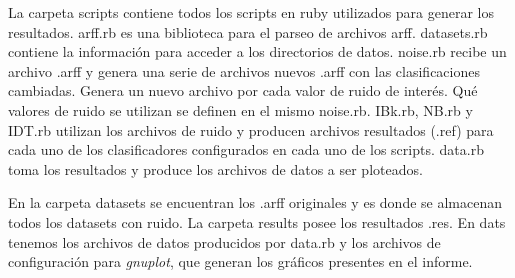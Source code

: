 \documentclass[a4paper,10pt]{article}
\begin{document}
La carpeta \textsf{scripts} contiene todos los scripts en ruby utilizados para generar los resultados. \textsf{arff.rb} es una biblioteca para el parseo de archivos \textsf{arff}. \textsf{datasets.rb} contiene la información para acceder a los directorios de datos. \textsf{noise.rb} recibe un archivo \textsf{.arff} y genera una serie de archivos nuevos \textsf{.arff} con las clasificaciones cambiadas. Genera un nuevo archivo por cada valor de ruido de interés. Qué valores de ruido se utilizan se definen en el mismo \textsf{noise.rb}. \textsf{IBk.rb}, \textsf{NB.rb} y \textsf{IDT.rb} utilizan los archivos de ruido y producen archivos resultados (\textsf{.ref}) para cada uno de los clasificadores configurados en cada uno de los scripts.  \textsf{data.rb} toma los resultados y produce los archivos de datos a ser ploteados.

En la carpeta \textsf{datasets} se encuentran los \textsf{.arff} originales y es donde se almacenan todos los datasets con ruido. La carpeta \textsf{results} posee los resultados \textsf{.res}. En \textsf{dats} tenemos los archivos de datos producidos por \textsf{data.rb} y los archivos de configuración para \emph{gnuplot}, que generan los gráficos presentes en el informe.
\end{document}
